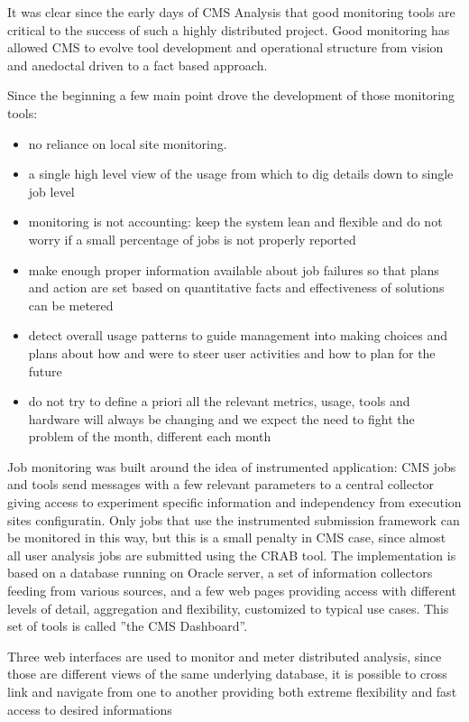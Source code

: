 It was clear since the early days of CMS Analysis that
good monitoring tools are critical to the success of such
a highly distributed project.
Good monitoring has allowed CMS to evolve tool development
and operational structure from vision and anedoctal driven
to a fact based approach.

Since the beginning a few main point drove the development of
those monitoring tools:
\begin{itemize}
\item no reliance on local site monitoring.
\item a single  high level view of the usage from which
  to dig details down to single job level
\item  monitoring is not accounting: keep the system lean and
 flexible and do not worry if a small
 percentage of jobs is not properly reported
\item make
  enough proper information available about job failures so that plans and
action are set
  based on quantitative facts and effectiveness of solutions can be metered
\item detect overall usage patterns to guide management into making
 choices and plans about how and were to steer user activities and
 how to plan for the future
\item do not try to define a priori all the relevant metrics, usage, tools and
 hardware will always be changing and we expect the need to fight the
  problem of the month, different each month
\end{itemize}

Job monitoring was built around the idea of instrumented
application: CMS jobs and tools send messages with a few relevant
parameters to a central collector giving
access to experiment specific information and independency
from execution sites configuratin. Only jobs that use the
instrumented submission framework can be monitored in this way,
but this is a small penalty in CMS case, since almost
all user analysis jobs are submitted using the CRAB tool.
The implementation is based on a
database running on Oracle server, a set of information collectors
feeding from various sources, 
and a few web pages providing access with different levels
of detail, aggregation and flexibility, customized to
typical use cases. This set of tools is called ''the CMS Dashboard''.

Three web interfaces are used to monitor and meter distributed analysis,
since those are different views of the same underlying database,
it is possible to cross link and navigate from one to another
providing both extreme flexibility and fast access to desired
informations

